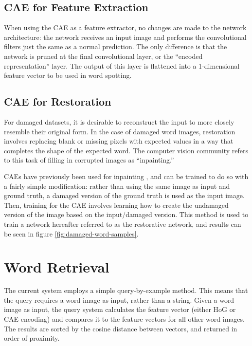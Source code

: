\documentclass[final]{ukthesis}
\begin{document}
\subsection{CAE for Feature Extraction}
When using the CAE as a feature extractor, no changes are made to the network architecture: the network receives an input image and performs the convolutional filters just the same as a normal prediction. The only difference is that the network is pruned at the final convolutional layer, or the ``encoded representation'' layer. The output of this layer is flattened into a 1-dimensional feature vector to be used in word spotting.

\subsection{CAE for Restoration}
For damaged datasets, it is desirable to reconstruct the input to more closely resemble their original form. In the case of damaged word images, restoration involves replacing blank or missing pixels with expected values in a way that completes the shape of the expected word. The computer vision community refers to this task of filling in corrupted images as ``inpainting.''

CAEs have previously been used for inpainting \cite{xie2012image}, and can be trained to do so with a fairly simple modification: rather than using the same image as input and ground truth, a damaged version of the ground truth is used as the input image. Then, training for the CAE involves learning how to create the undamaged version of the image based on the input/damaged version. This method is used to train a network hereafter referred to as the restorative network, and results can be seen in figure \ref{fig:damaged-word-samples}.


%
%
\section{Word Retrieval}
The current system employs a simple query-by-example method. This means that the query requires a word image as input, rather than a string. Given a word image as input, the query system calculates the feature vector (either HoG or CAE encoding) and compares it to the feature vectors for all other word images. The results are sorted by the cosine distance between vectors, and returned in order of proximity.



%
%
\end{document}
